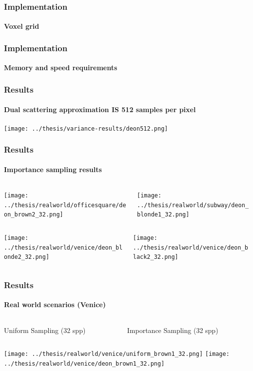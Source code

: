 \documentclass{beamer}
\begin{document}
  \begin{frame}
    \frametitle{Implementation}
    \framesubtitle{Voxel grid}
  \end{frame}
  
  \begin{frame}
    \frametitle{Implementation}
    \framesubtitle{Memory and speed requirements}
  \end{frame}
  
  \begin{frame}
    \frametitle{Results}
    \framesubtitle{Dual scattering approximation IS 512 samples per pixel}
    \centering
	\texttt{[image: ../thesis/variance-results/deon512.png]}    
  \end{frame}
  
  \begin{frame}
    \frametitle{Results}
    \framesubtitle{Importance sampling results}
    \centering
    
    \begin{columns}
    \begin{column}{0.5\textwidth}
    \texttt{[image: ../thesis/realworld/officesquare/deon\_brown2\_32.png]} 
    \end{column}
    \begin{column}{0.5\textwidth}
    \texttt{[image: ../thesis/realworld/subway/deon\_blonde1\_32.png]} 
    \end{column}
    \end{columns}
    
    \begin{columns}
    \begin{column}{0.5\textwidth}
    \texttt{[image: ../thesis/realworld/venice/deon\_blonde2\_32.png]} 
    \end{column}
    \begin{column}{0.5\textwidth}
    \texttt{[image: ../thesis/realworld/venice/deon\_black2\_32.png]} 
    \end{column}
    \end{columns}
       
  \end{frame}
  
  \begin{frame}
    \frametitle{Results}
    \framesubtitle{Real world scenarios (Venice)}
    \centering
    
    \begin{columns}
    \begin{column}{0.5\textwidth}
    \centering
    Uniform Sampling (32 spp) 
    \end{column}
	\begin{column}{0.5\textwidth}
	\centering
	Importance Sampling (32 spp)
	\end{column}
	\end{columns}  
    
	\texttt{[image: ../thesis/realworld/venice/uniform\_brown1\_32.png]}  
	\texttt{[image: ../thesis/realworld/venice/deon\_brown1\_32.png]}   
  \end{frame}
  
\end{document}
